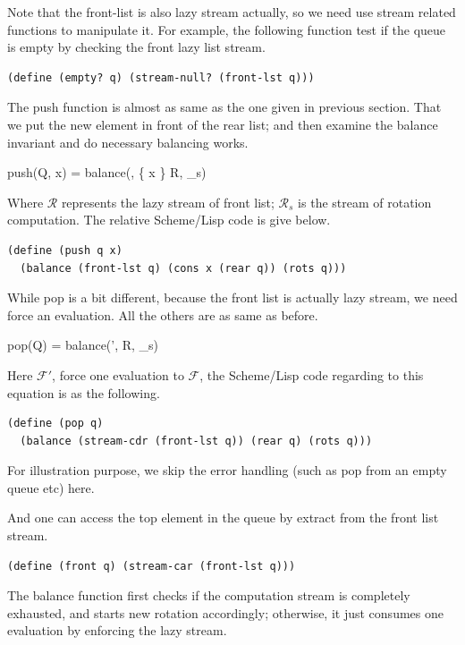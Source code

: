 \documentclass[UTF8]{article}
\begin{document}
Note that the front-list is also lazy stream actually, so we need use
stream related functions to manipulate it. For example, the following
function test if the queue is empty by checking the front lazy list stream.

\begin{lstlisting}
(define (empty? q) (stream-null? (front-lst q)))
\end{lstlisting}

The push function is almost as same as the one given in previous section.
That we put the new element in front of the rear list; and then examine
the balance invariant and do necessary balancing works.

\be
push(Q, x) = balance(, \{ x \} \cup R, _s)
\ee

Where $\mathcal{R}$ represents the lazy stream of front list; $\mathcal{R}_s$ is
the stream of rotation computation. The relative Scheme/Lisp
code is give below.

\begin{lstlisting}
(define (push q x)
  (balance (front-lst q) (cons x (rear q)) (rots q)))
\end{lstlisting}

While pop is a bit different, because the front list is actually lazy stream,
we need force an evaluation. All the others are as same as before.

\be
pop(Q) = balance(', R, _s)
\ee

Here $\mathcal{F}'$, force one evaluation to $\mathcal{F}$, the Scheme/Lisp
code regarding to this equation is as the following.

\begin{lstlisting}
(define (pop q)
  (balance (stream-cdr (front-lst q)) (rear q) (rots q)))
\end{lstlisting}

For illustration purpose, we skip the error handling (such as pop from
an empty queue etc) here.

And one can access the top element in the queue by extract from
the front list stream.

\begin{lstlisting}
(define (front q) (stream-car (front-lst q)))
\end{lstlisting}

The balance function first checks if the computation stream is completely
exhausted, and starts new rotation accordingly; otherwise, it just consumes
one evaluation by enforcing the lazy stream.
\end{document}
